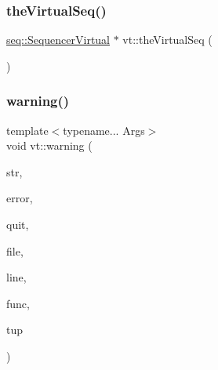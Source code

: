 \mbox{\label{namespacevt_abdbb9ddb0d79b35c89e9d742d3fc9d42}} 
\subsubsection{\texorpdfstring{the\+Virtual\+Seq()}{theVirtualSeq()}}
{\footnotesize\ttfamily \hyperlink{structvt_1_1seq_1_1_sequencer_virtual}{seq\+::\+Sequencer\+Virtual} $\ast$ vt\+::the\+Virtual\+Seq (\begin{DoxyParamCaption}{ }\end{DoxyParamCaption})}

\mbox{\label{namespacevt_af11de63df5da8fa58bd668f4e5026a72}} 
\subsubsection{\texorpdfstring{warning()}{warning()}}
{\footnotesize\ttfamily template$<$typename... Args$>$ \\
void vt\+::warning (\begin{DoxyParamCaption}\item[{std\+::string const \&}]{str,  }\item[{\hyperlink{namespacevt_a793764d753923abc3d32929870beb485}{Error\+Code\+Type}}]{error,  }\item[{bool}]{quit,  }\item[{std\+::string const \&}]{file,  }\item[{int const}]{line,  }\item[{std\+::string const \&}]{func,  }\item[{std\+::tuple$<$ Args... $>$ \&\&}]{tup }\end{DoxyParamCaption})\hspace{0.3cm}{\ttfamily [inline]}}

\mbox{\label{namespacevt_aa6fe252e38e90473ff359bfa7586bc8b}} 
